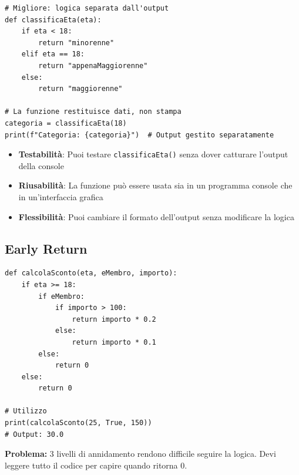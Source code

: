 \begin{lstlisting}
# Migliore: logica separata dall'output
def classificaEta(eta):
    if eta < 18:
        return "minorenne"
    elif eta == 18:
        return "appenaMaggiorenne"
    else:
        return "maggiorenne"

# La funzione restituisce dati, non stampa
categoria = classificaEta(18)
print(f"Categoria: {categoria}")  # Output gestito separatamente
\end{lstlisting}
\begin{tcolorbox}[title=Perché separare logica da I/O?]
\begin{itemize}
  \item \textbf{Testabilità}: Puoi testare \texttt{classificaEta()} senza dover catturare l'output della console
  \item \textbf{Riusabilità}: La funzione può essere usata sia in un programma console che in un'interfaccia grafica
  \item \textbf{Flessibilità}: Puoi cambiare il formato dell'output senza modificare la logica
\end{itemize}
\end{tcolorbox}

\subsection{Early Return}
\label{subsec:cf-early-return}

\begin{tcolorbox}[
    title=\textbf{Senza early return - Annidamento profondo},
    colback=red!10,
    colframe=red!80!black,
    fonttitle=\bfseries,
    boxrule=1.5pt,
    arc=2mm
]
\begin{lstlisting}
def calcolaSconto(eta, eMembro, importo):
    if eta >= 18:
        if eMembro:
            if importo > 100:
                return importo * 0.2
            else:
                return importo * 0.1
        else:
            return 0
    else:
        return 0

# Utilizzo
print(calcolaSconto(25, True, 150))
# Output: 30.0
\end{lstlisting}
\textbf{Problema:} 3 livelli di annidamento rendono difficile seguire la logica. Devi leggere tutto il codice per capire quando ritorna 0.
\end{tcolorbox}

\vspace{0.3cm}

